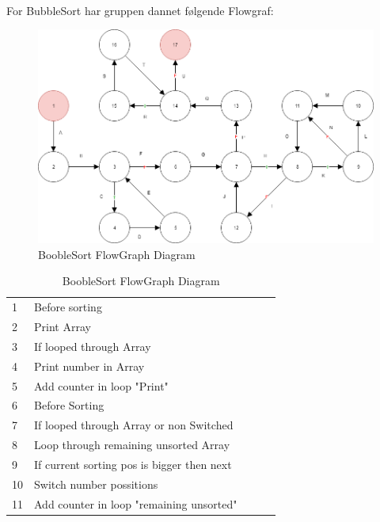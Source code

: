 \documentclass[11pt]{article}
\begin{document}
    \\
    \noindent
    For BubbleSort har gruppen dannet følgende Flowgraf:\\
    \begin{table}[H]
        \begin{minipage}{.7\textwidth}
            \begin{figure}[H]
            \centering
            \includegraphics[width=1\textwidth,angle=0]{Struktureret_System_Udvikling/Workshop_3/Booble_Sort_Flowgraph.png}
            \caption{BoobleSort FlowGraph Diagram}
            \label{fig:BoobleSortGraph}
            \end{figure}
        \end{minipage}
        \begin{minipage}{.3\textwidth}
            \quad
            \begin{tabular}{lllll}
                1 & Before sorting\\
                2 & Print Array\\
                3 & If looped through Array\\
                4 & Print number in Array\\
                5 & Add counter in loop "Print"\\
                6 & Before Sorting\\
                7 & If looped through Array or non Switched\\
                8 & Loop through remaining unsorted Array\\
                9 & If current sorting pos is bigger then next\\
                10 & Switch number possitions\\
                11 & Add counter in loop "remaining unsorted"\\

\end{tabular}
\end{minipage}
\end{table}
\end{document}
